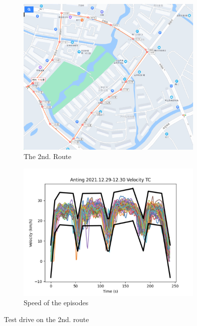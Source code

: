 \documentclass{article}
\begin{document}
\begin{figure}[htbp]
	\centering
	\begin{subfigure}[t]{0.45\textwidth}
		\centering
		\includegraphics[width=\textwidth]{images/openroad_b_map.png}
		\caption{The 2nd. Route}\label{fig:2nd route}
	\end{subfigure}
	\hfill
	\begin{subfigure}[t]{0.45\textwidth}
		\centering
		\includegraphics[width=\textwidth]{images/openroad_b_velocity.png}
		\caption{Speed of the episodes}\label{fig:openroad b speed}
	\end{subfigure}
	\caption{Test drive on the 2nd. route\label{fig:open road b}}
\end{figure}
\end{document}
